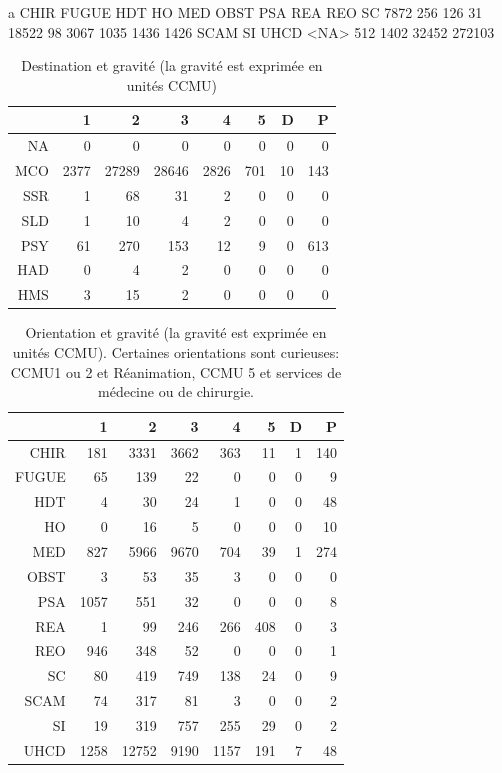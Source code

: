 \documentclass[12pt,english,french,twoside]{book}\usepackage[]{graphicx}\usepackage[]{color}
\begin{document}
a
  CHIR  FUGUE    HDT     HO    MED   OBST    PSA    REA    REO     SC 
  7872    256    126     31  18522     98   3067   1035   1436   1426 
  SCAM     SI   UHCD   <NA> 
   512   1402  32452 272103 
\begin{table}[ht]
\centering
\begin{tabular}{rrrrrrrr}
  \hline
 & 1 & 2 & 3 & 4 & 5 & D & P \\ 
  \hline
NA &   0 &   0 &   0 &   0 &   0 &   0 &   0 \\ 
  MCO & 2377 & 27289 & 28646 & 2826 & 701 &  10 & 143 \\ 
  SSR &   1 &  68 &  31 &   2 &   0 &   0 &   0 \\ 
  SLD &   1 &  10 &   4 &   2 &   0 &   0 &   0 \\ 
  PSY &  61 & 270 & 153 &  12 &   9 &   0 & 613 \\ 
  HAD &   0 &   4 &   2 &   0 &   0 &   0 &   0 \\ 
  HMS &   3 &  15 &   2 &   0 &   0 &   0 &   0 \\ 
   \hline
\end{tabular}
\caption[Destination et gravité]{Destination et gravité (la gravité est exprimée en unités CCMU)} 
\label{tab:dest_gravite}
\end{table}
\begin{table}[ht]
\centering
\begin{tabular}{rrrrrrrr}
  \hline
 & 1 & 2 & 3 & 4 & 5 & D & P \\ 
  \hline
CHIR & 181 & 3331 & 3662 & 363 &  11 &   1 & 140 \\ 
  FUGUE &  65 & 139 &  22 &   0 &   0 &   0 &   9 \\ 
  HDT &   4 &  30 &  24 &   1 &   0 &   0 &  48 \\ 
  HO &   0 &  16 &   5 &   0 &   0 &   0 &  10 \\ 
  MED & 827 & 5966 & 9670 & 704 &  39 &   1 & 274 \\ 
  OBST &   3 &  53 &  35 &   3 &   0 &   0 &   0 \\ 
  PSA & 1057 & 551 &  32 &   0 &   0 &   0 &   8 \\ 
  REA &   1 &  99 & 246 & 266 & 408 &   0 &   3 \\ 
  REO & 946 & 348 &  52 &   0 &   0 &   0 &   1 \\ 
  SC &  80 & 419 & 749 & 138 &  24 &   0 &   9 \\ 
  SCAM &  74 & 317 &  81 &   3 &   0 &   0 &   2 \\ 
  SI &  19 & 319 & 757 & 255 &  29 &   0 &   2 \\ 
  UHCD & 1258 & 12752 & 9190 & 1157 & 191 &   7 &  48 \\ 
   \hline
\end{tabular}
\caption[Orientation et gravité]{Orientation et gravité (la gravité est exprimée en unités CCMU). Certaines orientations sont curieuses: CCMU1 ou 2 et Réanimation, CCMU 5 et services de médecine ou de chirurgie.} 
\label{tab:orient_gravite}
\end{table}
\end{document}

